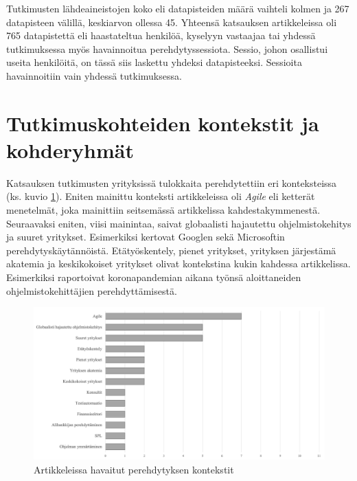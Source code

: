 \documentclass[utf8]{gradu3}
\begin{document}
Tutkimusten lähdeaineistojen koko eli datapisteiden määrä vaihteli kolmen \parencite{kulkarni-ym-2010} ja 267 datapisteen \parencite{rodeghero-ym-2021} välillä, keskiarvon ollessa 45. Yhteensä katsauksen artikkeleissa oli 765 datapistettä eli haastateltua henkilöä, kyselyyn vastaajaa tai yhdessä tutkimuksessa myös havainnoitua perehdytyssessiota. Sessio, johon osallistui useita henkilöitä, on tässä siis laskettu yhdeksi datapisteeksi. Sessioita havainnoitiin vain yhdessä tutkimuksessa.






\section{Tutkimuskohteiden kontekstit ja kohderyhmät}
\label{luku-tulokset-kontekstit-kohderyhmät}

Katsauksen tutkimusten yrityksissä tulokkaita perehdytettiin eri konteksteissa (ks. kuvio \ref{kuvio:kontekstit}). Eniten mainittu konteksti artikkeleissa oli \textit{Agile} eli ketterät menetelmät, joka mainittiin seitsemässä artikkelissa kahdestakymmenestä. Seuraavaksi eniten, viisi mainintaa, saivat globaalisti hajautettu ohjelmistokehitys ja suuret yritykset. Esimerkiksi \textcite{johnson-senges-2010} kertovat Googlen sekä \textcite{rodeghero-ym-2021} \textcite{ju-ym-2021} Microsoftin perehdytyskäytännöistä. Etätyöskentely, pienet yritykset, yrityksen järjestämä akatemia ja keskikokoiset yritykset olivat kontekstina kukin kahdessa artikkelissa. Esimerkiksi \textcite{rodeghero-ym-2021} raportoivat koronapandemian aikana työnsä aloittaneiden ohjelmistokehittäjien perehdyttämisestä.

\begin{figure}[h]
    \centering
    \includegraphics[width=\textwidth]{media/kontekstit.png}
    \caption{Artikkeleissa havaitut perehdytyksen kontekstit}
    \label{kuvio:kontekstit}
\end{figure}
\end{document}

